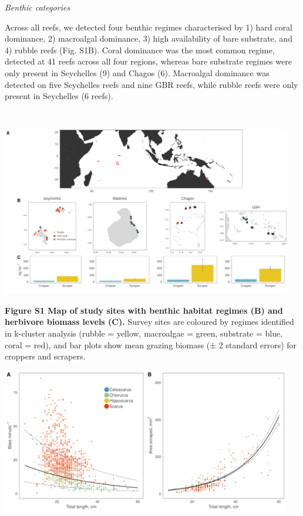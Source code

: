 \documentclass[12pt,]{article}
\begin{document}
\emph{Benthic categories}

Across all reefs, we detected four benthic regimes characterised by 1)
hard coral dominance, 2) macroalgal dominance, 3) high availability of
bare substrate, and 4) rubble reefs (Fig. S1B). Coral dominance was the
most common regime, detected at 41 reefs across all four regions,
whereas bare substrate regimes were only present in Seychelles (9) and
Chagos (6). Macroalgal dominance was detected on five Seychelles reefs
and nine GBR reefs, while rubble reefs were only present in Seychelles
(6 reefs).

~

\begin{center}\includegraphics[width=480px]{../../figures/Figure1} \end{center}

\textbf{Figure S1 \textbar{} Map of study sites with benthic habitat
regimes (B) and herbivore biomass levels (C).} Survey sites are coloured
by regimes identified in k-cluster analysis (rubble = yellow, macroalgae
= green, substrate = blue, coral = red), and bar plots show mean grazing
biomass (± 2 standard errors) for croppers and scrapers.

\newpage

\begin{center}\includegraphics[width=480px]{../../figures/FigureS1_scrape_size} \end{center}
\end{document}
